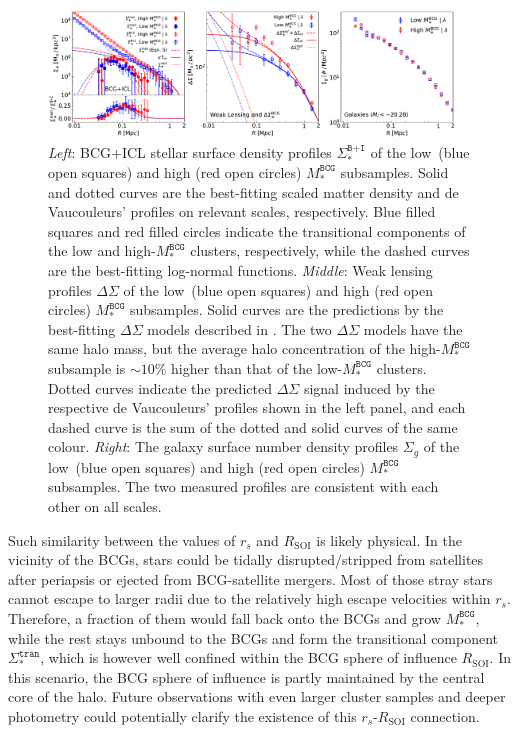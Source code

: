 \documentclass[fleqn,usenatbib]{mnras}
\newcommand{\rsoi}{R_{\mathrm{SOI}}}
\newcommand{\sigbi}{\Sigma_*^{\texttt{B+I}}}
\newcommand{\sigg}{\Sigma_g}
\newcommand{\sigtr}{\Sigma_*^{\texttt{tran}}}
\newcommand{\msbcg}{M_*^{\texttt{BCG}}}
\newcommand{\ds}{\Delta\Sigma}
\begin{document}
\begin{figure}
    \centering\includegraphics[width=0.96\textwidth]{fig/subsamples_SB_SM.pdf}
    \caption{{\it Left}: BCG+ICL stellar surface density profiles $\sigbi$
    of the low~(blue open squares) and high (red open circles) $\msbcg$
    subsamples. Solid and dotted curves are the best-fitting scaled matter
    density and de Vaucouleurs' profiles on relevant scales, respectively.
    Blue filled squares and red filled circles indicate the transitional
    components of the low and high-$\msbcg$ clusters, respectively, while
    the dashed curves are the best-fitting log-normal functions.  {\it
    Middle}: Weak lensing profiles $\ds$ of the low~(blue open squares) and
    high (red open circles) $\msbcg$ subsamples. Solid curves are the
    predictions by the best-fitting $\ds$ models described in
    . The two $\ds$ models have the same halo mass, but
    the average halo concentration of the high-$\msbcg$ subsample is
    ${\sim}10\%$ higher than that of the low-$\msbcg$ clusters. Dotted
    curves indicate the predicted $\ds$ signal induced by the respective de
    Vaucouleurs' profiles shown in the left panel, and each dashed curve is
    the sum of the dotted and solid curves of the same colour.  {\it
    Right}: The galaxy surface number density profiles $\sigg$ of the
    low~(blue open squares) and high (red open circles) $\msbcg$
    subsamples. The two measured profiles are consistent with each other on
all scales. \label{fig:subdecomposition}}
\end{figure}


Such similarity between the values of $r_s$ and $\rsoi$ is likely physical.
In the vicinity of the BCGs, stars could be tidally disrupted/stripped from
satellites after periapsis or ejected from BCG-satellite mergers. Most of
those stray stars cannot escape to larger radii due to the relatively high
escape velocities within $r_s$. Therefore, a fraction of them would fall
back onto the BCGs and grow $\msbcg$, while the rest stays unbound to the
BCGs and form the transitional component $\sigtr$, which is however well
confined within the BCG sphere of influence $\rsoi$. In this scenario, the
BCG sphere of influence is partly maintained by the central core of the
halo. Future observations with even larger cluster samples and deeper
photometry could potentially clarify the existence of this $r_s$-$\rsoi$
connection.
\end{document}
